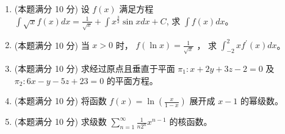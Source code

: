 \begin{enumerate}
\begin{enumerate}
	
	
	
\end{enumerate}


	
\newpage
\item
(本题满分 10 分)	
设 $f(x)$ 满足方程 $\int \sqrt{x} f(x) d x=\frac{1}{\sqrt{x}}+\int x^{\frac{3}{2}} \sin x d x+C$, 求 $\int f(x) d x$。





\item
(本题满分 10 分)	
当 $x>0$ 时， $f(\ln x)=\frac{1}{\sqrt{x}}$ ， 求 $\int_{-2}^{2} x f^{\prime}(x) d x$。
	




\item
(本题满分 10 分)	
求经过原点且垂直于平面 $\pi_{1}: x+2 y+3 z-2=0$ 及 $\pi_{2}: 6 x-y-5 z+23=0$ 的平面方程。


	
	

\item
(本题满分 10 分)	
将函数 $f(x)=\ln \left(\frac{x}{1-x}\right)$ 展开成 $x-1$ 的幂级数。





\item
(本题满分 10 分)	
求级数 $\sum\limits_{n=1}^{\infty} \frac{1}{n 2^{n}} x^{n-1}$ 的核函数。

	


\end{enumerate}
